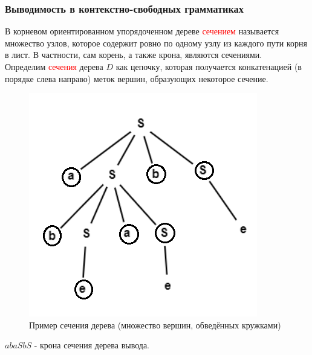 \documentclass{beamer}
\begin{document}
	\begin{frame}
    \frametitle{Выводимость в контекстно-свободных грамматиках}
        В корневом ориентированном упорядоченном дереве \textcolor{red}{сечением} называется множество узлов, которое содержит ровно по одному узлу из каждого пути корня в лист. В частности, сам корень, а также крона, являются сечениями. \\
        \vspace{3mm}
        Определим \textcolor{red}{сечения} дерева $D$ как цепочку, которая получается конкатенацией (в порядке слева направо) меток вершин, образующих некоторое сечение.\\
        
         \begin{figure}[!tbp]
          \centering
          \begin{minipage}[b]{0.35\textwidth}
            \includegraphics[width=\textwidth]{crown_pruning_ex.png}
          \end{minipage}
          \caption{Пример сечения дерева (множество вершин, обведённых кружками)}
          \end{figure}
          $abaSbS$ - крона сечения дерева вывода.
          
	\end{frame}
	
\end{document}
